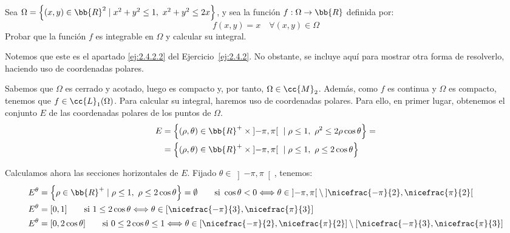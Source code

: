 \begin{ejercicio}
    Sea $\Omega=\left\{(x,y)\in \bb{R}^2 \mid x^2+y^2\leq 1,~x^2+y^2\leq 2x\right\}$, y sea la función $f:\Omega\to \bb{R}$ definida por:
    \[ f(x,y) = x \quad \forall (x,y)\in \Omega \]
    Probar que la función \( f \) es integrable en \( \Omega \) y calcular su integral.

    \begin{observacion}
        Notemos que este es el apartado \ref{ej:2.4.2.2} del Ejercicio~\ref{ej:2.4.2}.
        No obstante, se incluye aquí para mostrar otra forma de resolverlo, haciendo uso de coordenadas polares.
    \end{observacion}

    Sabemos que $\Omega$ es cerrado y acotado, luego es compacto y, por tanto, $\Omega\in \cc{M}_2$. Además, como $f$ es continua y $\Omega$ es compacto, tenemos que $f\in \cc{L}_1(\Omega)$.
    Para calcular su integral, haremos uso de coordenadas polares. Para ello, en primer lugar, obtenemos el conjunto $E$ de las coordenadas polares de los puntos de $\Omega$.
    \begin{align*}
        E &= \left\{ (\rho, \theta) \in \bb{R}^+\times \left]-\pi, \pi\right[ ~\mid \rho\leq 1,~\rho^2\leq 2\rho\cos\theta \right\} =\\
        &= \left\{ (\rho, \theta) \in \bb{R}^+\times \left]-\pi, \pi\right[ ~\mid \rho\leq 1,~\rho\leq 2\cos\theta \right\}
    \end{align*}

    Calculamos ahora las secciones horizontales de $E$. Fijado $\theta\in \left]-\pi, \pi\right[$, tenemos:
    \begin{align*}
        E^{\theta} &= \left\{ \rho\in \bb{R}^+ \mid \rho\leq 1,~\rho\leq 2\cos\theta \right\} = \emptyset \qquad \text{si } \cos\theta < 0 \Longleftrightarrow \theta\in \left]-\pi, \pi\right[\setminus \left]\nicefrac{-\pi}{2}, \nicefrac{\pi}{2}\right[\\
        E^{\theta} &= [0, 1] \qquad \text{si } 1\leq 2\cos\theta \Longleftrightarrow \theta\in \left[\nicefrac{-\pi}{3}, \nicefrac{\pi}{3}\right] \\
        E^{\theta} &= [0, 2\cos\theta] \qquad \text{si } 0\leq 2\cos\theta \leq 1 \Longleftrightarrow \theta\in \left[\nicefrac{-\pi}{2}, \nicefrac{\pi}{2}\right]\setminus \left[\nicefrac{-\pi}{3}, \nicefrac{\pi}{3}\right]
    \end{align*}


\end{ejercicio}
